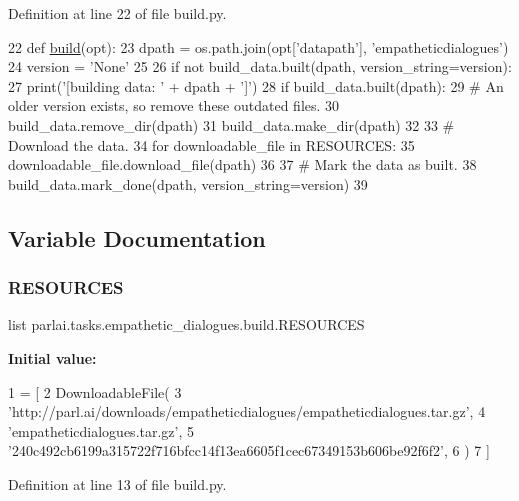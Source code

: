 Definition at line 22 of file build.\+py.


\begin{DoxyCode}
22 \textcolor{keyword}{def }\hyperlink{namespacedialog__babi__feedback_1_1build_a7a9d289f7493a5ded13c4b7f071b6184}{build}(opt):
23     dpath = os.path.join(opt[\textcolor{stringliteral}{'datapath'}], \textcolor{stringliteral}{'empatheticdialogues'})
24     version = \textcolor{stringliteral}{'None'}
25 
26     \textcolor{keywordflow}{if} \textcolor{keywordflow}{not} build\_data.built(dpath, version\_string=version):
27         print(\textcolor{stringliteral}{'[building data: '} + dpath + \textcolor{stringliteral}{']'})
28         \textcolor{keywordflow}{if} build\_data.built(dpath):
29             \textcolor{comment}{# An older version exists, so remove these outdated files.}
30             build\_data.remove\_dir(dpath)
31         build\_data.make\_dir(dpath)
32 
33         \textcolor{comment}{# Download the data.}
34         \textcolor{keywordflow}{for} downloadable\_file \textcolor{keywordflow}{in} RESOURCES:
35             downloadable\_file.download\_file(dpath)
36 
37         \textcolor{comment}{# Mark the data as built.}
38         build\_data.mark\_done(dpath, version\_string=version)
39 \end{DoxyCode}


\subsection{Variable Documentation}
\mbox{\label{namespaceparlai_1_1tasks_1_1empathetic__dialogues_1_1build_a9d2945e43f4f4d167ef6d78275f37490}} 
\subsubsection{\texorpdfstring{R\+E\+S\+O\+U\+R\+C\+ES}{RESOURCES}}
{\footnotesize\ttfamily list parlai.\+tasks.\+empathetic\+\_\+dialogues.\+build.\+R\+E\+S\+O\+U\+R\+C\+ES}

{\bfseries Initial value\+:}
\begin{DoxyCode}
1 =  [
2     DownloadableFile(
3         \textcolor{stringliteral}{'http://parl.ai/downloads/empatheticdialogues/empatheticdialogues.tar.gz'},
4         \textcolor{stringliteral}{'empatheticdialogues.tar.gz'},
5         \textcolor{stringliteral}{'240c492cb6199a315722f716bfcc14f13ea6605f1cec67349153b606be92f6f2'},
6     )
7 ]
\end{DoxyCode}


Definition at line 13 of file build.\+py.

